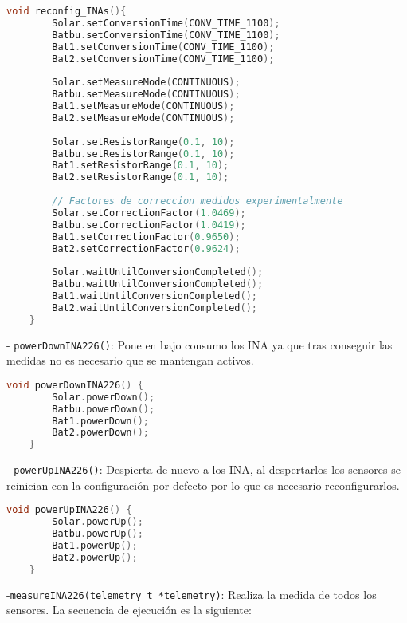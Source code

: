 \begin{lstlisting}[captionpos=b, caption={Codigo funcion reconfig\_INAs}, language=c++]
    void reconfig_INAs(){
        Solar.setConversionTime(CONV_TIME_1100);
        Batbu.setConversionTime(CONV_TIME_1100);
        Bat1.setConversionTime(CONV_TIME_1100);
        Bat2.setConversionTime(CONV_TIME_1100);
    
        Solar.setMeasureMode(CONTINUOUS);
        Batbu.setMeasureMode(CONTINUOUS);
        Bat1.setMeasureMode(CONTINUOUS);
        Bat2.setMeasureMode(CONTINUOUS);
        
        Solar.setResistorRange(0.1, 10);
        Batbu.setResistorRange(0.1, 10);
        Bat1.setResistorRange(0.1, 10);
        Bat2.setResistorRange(0.1, 10);
        
        // Factores de correccion medidos experimentalmente
        Solar.setCorrectionFactor(1.0469);
        Batbu.setCorrectionFactor(1.0419);
        Bat1.setCorrectionFactor(0.9650);
        Bat2.setCorrectionFactor(0.9624);
        
        Solar.waitUntilConversionCompleted();
        Batbu.waitUntilConversionCompleted();
        Bat1.waitUntilConversionCompleted();
        Bat2.waitUntilConversionCompleted();
    }
\end{lstlisting}

- \texttt{powerDownINA226()}: Pone en bajo consumo los INA ya que tras conseguir las medidas no es necesario que se mantengan activos.

\begin{lstlisting}[captionpos=b, caption={Codigo funcion powerDownINA226}, language=c++]
    void powerDownINA226() {
        Solar.powerDown();
        Batbu.powerDown();
        Bat1.powerDown();
        Bat2.powerDown();
    }
\end{lstlisting}


- \texttt{powerUpINA226()}: Despierta de nuevo a los INA, al despertarlos los sensores se reinician con la configuración por defecto por lo que es necesario reconfigurarlos.

\begin{lstlisting}[captionpos=b, caption={Codigo funcion powerUpINA226}, language=c++]
    void powerUpINA226() {
        Solar.powerUp();
        Batbu.powerUp();
        Bat1.powerUp();
        Bat2.powerUp();
    }
\end{lstlisting}

-\texttt{measureINA226(telemetry\_t *telemetry)}: Realiza la medida de todos los sensores. La secuencia de ejecución es la siguiente:

